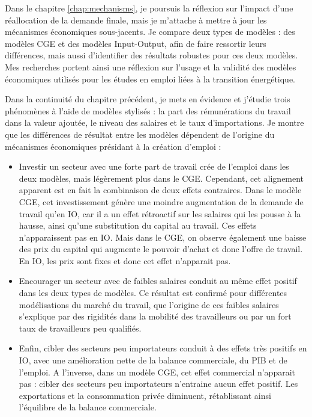 Dans le chapitre \ref{chap:mechanisms}, je poursuis la réflexion sur l'impact d'une réallocation de la demande finale, mais je m'attache à mettre à jour les mécanismes économiques sous-jacents. Je compare deux types de modèles : des modèles CGE et des modèles Input-Output, afin de faire ressortir leurs différences, mais aussi d'identifier des résultats robustes pour ces deux modèles. Mes recherches portent ainsi une réflexion sur l’usage et la validité des modèles économiques utilisés pour les études en emploi liées à la transition énergétique. 

Dans la continuité du chapitre précédent, je mets en évidence et j’étudie trois phénomènes à l'aide de modèles stylisés : la part des rémunérations du travail dans la valeur ajoutée, le niveau des salaires et le taux d'importations.
Je montre que les différences de résultat entre les modèles dépendent de l'origine du mécanismes économiques présidant à la création d'emploi : 
\begin{itemize}
	\item Investir un secteur avec une forte part de travail crée de l'emploi dans les deux modèles, mais légèrement plus dans le CGE. Cependant, cet alignement apparent est en fait la combinaison de deux effets contraires. Dans le modèle CGE, cet investissement génère une moindre augmentation de la demande de travail qu'en IO, car il a un effet rétroactif sur les salaires qui les pousse à la hausse, ainsi qu'une substitution du capital au travail. Ces effets n'apparaissent pas en IO. Mais dans le CGE, on observe également une baisse des prix du capital qui augmente le pouvoir d'achat et donc l'offre de travail. En IO, les prix sont fixes et donc cet effet n'apparait pas.
	\item Encourager un secteur avec de faibles salaires conduit au même effet positif dans les deux types de modèles. Ce résultat est confirmé pour différentes modélisations du marché du travail, que l'origine de ces faibles salaires s'explique par des rigidités dans la mobilité des travailleurs ou par un fort taux de travailleurs peu qualifiés.
	\item Enfin, cibler des secteurs peu importateurs conduit à des effets très positifs en IO, avec une amélioration nette de la balance commerciale, du PIB et de l'emploi. A l'inverse, dans un modèle CGE, cet effet commercial n'apparait pas : cibler des secteurs peu importateurs n'entraine aucun effet positif. Les exportations et la consommation privée diminuent, rétablissant ainsi l'équilibre de la balance commerciale.
\end{itemize}

